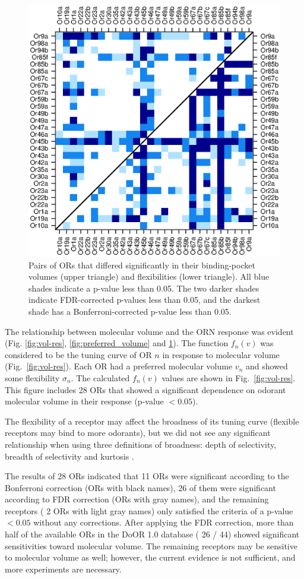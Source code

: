 \documentclass[fleqn,11pt]{wlscirep}
\newcommand{\numberofreceptors}{ 28 }
\newcommand{\bonferroni}{ 11 }
\newcommand{\fdr}{ 26 }
\newcommand{\nocorrection}{ 2 }
\begin{document}
\begin{figure}
	\centering
	\includegraphics[width= 0.75 \textwidth]{pair-pval}
	\caption{Pairs of ORs that differed significantly in their binding-pocket volumes (upper triangle) and flexibilities (lower triangle).
			All blue shades indicate a p-value less than 0.05. 
			The two darker shades indicate FDR-corrected p-values less than 0.05, and the darkest shade has a Bonferroni-corrected p-value less than 0.05.}
	\label{fig:p-values}
\end{figure}

The relationship between molecular volume and the ORN response was evident (Fig. \ref{fig:vol-res}, \ref{fig:preferred_volume} and \ref{fig:p-values}). 
The function $f_n(v)$ was considered to be the tuning curve of OR $n$ in response to molecular volume (Fig.~\ref{fig:vol-res}). 
Each OR had a preferred molecular volume $v_n$ and showed some flexibility $\sigma_n$. 
The calculated $f_n(v)$ values are shown in Fig.~\ref{fig:vol-res}. 
This figure includes \numberofreceptors ORs 
that showed a significant dependence on odorant molecular volume in their response (p-value $<0.05$). 

The flexibility of a receptor may affect the broadness of its tuning curve (flexible receptors may bind to more odorants), 
but we did not see any significant relationship when 
using three definitions of broadness: depth of selectivity, breadth of selectivity and kurtosis \cite{moody1998model,freedman2006experience,muench2015door}.

The results of \numberofreceptors ORs indicated that 
\bonferroni ORs were significant according to the Bonferroni correction (ORs with black names), 
\fdr of them were significant according to FDR correction (ORs with gray names), 
and the remaining receptors (\nocorrection ORs with light gray names) 
only satisfied the criteria of a p-value $<0.05$ without any corrections.
After applying the FDR correction, 
more than half of the available ORs in the DoOR 1.0 database (\fdr / 44) showed significant sensitivities toward molecular volume. 
The remaining receptors may be sensitive to molecular volume as well; however, 
the current evidence is not sufficient, and more experiments are necessary. 
\end{document}
